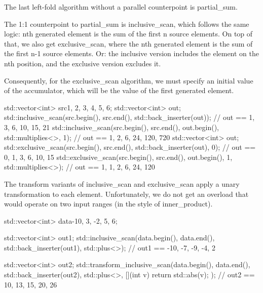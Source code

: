 The last left-fold algorithm without a parallel counterpoint is partial\_sum.



The 1:1 counterpoint to partial\_sum is inclusive\_scan, which follows the same logic: nth generated element is the sum of the first n source elements. On top of that, we also get exclusive\_scan, where the nth generated element is the sum of the first n-1 source elements. Or: the inclusive version includes the element on the nth position, and the exclusive version excludes it.

Consequently, for the exclusive\_scan algorithm, we must specify an initial value of the accumulator, which will be the value of the first generated element.

\begin{box-note}
\begin{cppcode}
std::vector<int> src{1, 2, 3, 4, 5, 6};
{
    std::vector<int> out;
    std::inclusive_scan(src.begin(), src.end(), std::back_inserter(out));
    // out == {1, 3, 6, 10, 15, 21}
    std::inclusive_scan(src.begin(), src.end(), out.begin(), std::multiplies<>{}, 1);
    // out == {1, 2, 6, 24, 120, 720}
}
{
    std::vector<int> out;
    std::exclusive_scan(src.begin(), src.end(), std::back_inserter(out), 0);
    // out == {0, 1, 3, 6, 10, 15}
    std::exclusive_scan(src.begin(), src.end(), out.begin(), 1, std::multiplies<>{});
    // out == {1, 1, 2, 6, 24, 120}
}
\end{cppcode}
\end{box-note}



The transform variants of inclusive\_scan and exclusive\_scan apply a unary transformation to each element. Unfortunately, we do not get an overload that would operate on two input ranges (in the style of inner\_product).

\begin{box-note}
\begin{cppcode}
std::vector<int> data{-10, 3, -2, 5, 6};

std::vector<int> out1;
std::inclusive_scan(data.begin(), data.end(), std::back_inserter(out1), 
                    std::plus<>{});
// out1 == {-10, -7, -9, -4, 2}

std::vector<int> out2;
std::transform_inclusive_scan(data.begin(), data.end(), std::back_inserter(out2), 
                              std::plus<>{}, [](int v) { return std::abs(v); });
// out2 == {10, 13, 15, 20, 26}
\end{cppcode}
\end{box-note}

